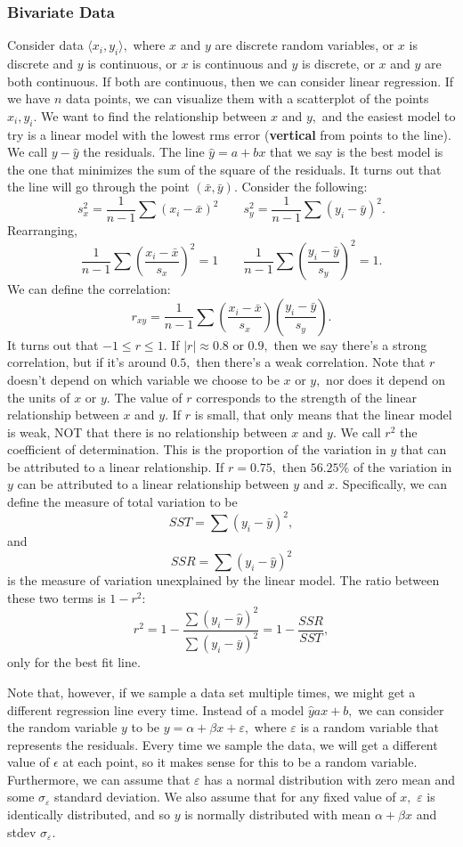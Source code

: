 \documentclass[12pt]{article}
\theoremstyle{remark}
\begin{document}
\subsubsection{Bivariate Data}
Consider data $\langle x_i,y_i\rangle,$ where $x$ and $y$ are discrete random variables, or $x$ is discrete and $y$ is continuous, or $x$ is continuous and $y$ is discrete, or $x$ and $y$ are both continuous. If both are continuous, then we can consider linear regression.
If we have $n$ data points, we can visualize them with a scatterplot of the points $x_i,y_i.$ We want to find the relationship between $x$ and $y,$ and the easiest model to try is a linear model with the lowest rms error (\textbf{vertical} from points to the line). We call $y-\hat{y}$ the residuals. The line $\hat y=a+bx$ that we say is the best model is the one that minimizes the sum of the square of the residuals. It turns out that the line will go through the point $(\bar{x},\bar{y}).$ Consider the following:
\[s_x^2=\frac{1}{n-1}\sum(x_i-\bar{x})^2\qquad s_y^2=\frac{1}{n-1}\sum (y_i-\bar{y})^2.\] Rearranging,
\[\frac{1}{n-1}\sum\left(\frac{x_i-\bar{x}}{s_x}\right)^2=1\qquad \frac{1}{n-1}\sum \left(\frac{y_i-\bar{y}}{s_y}\right)^2=1.\]
We can define the correlation:
\[r_{xy}=\frac{1}{n-1}\sum\left(\frac{x_i-\bar{x}}{s_x}\right)\left(\frac{y_i-\bar{y}}{s_y}\right).\] It turns out that $-1\le r\le 1.$ If $|r|\approx 0.8$ or $0.9,$ then we say there's a strong correlation, but if it's around $0.5,$ then there's a weak correlation. Note that $r$ doesn't depend on which variable we choose to be $x$ or $y,$ nor does it depend on the units of $x$ or $y.$ The value of $r$ corresponds to the strength of the linear relationship between $x$ and $y.$ If $r$ is small, that only means that the linear model is weak, NOT that there is no relationship between $x$ and $y.$ We call $r^2$ the coefficient of determination. This is the proportion of the variation in $y$ that can be attributed to a linear relationship. If $r=0.75,$ then $56.25\%$ of the variation in $y$ can be attributed to a linear relationship between $y$ and $x.$ Specifically, we can define the measure of total variation to be
\[SST=\sum (y_i-\bar{y})^2,\] and
\[SSR=\sum(y_i-\hat y)^2\] is the measure of variation unexplained by the linear model. The ratio between these two terms is $1-r^2:$
\[r^2=1-\frac{\sum(y_i-\hat y)^2}{\sum(y_i-\bar{y})^2}=1-\frac{SSR}{SST},\] only for the best fit line.

Note that, however, if we sample a data set multiple times, we might get a different regression line every time. Instead of a model $\hat y ax+b,$ we can consider the random variable $y$ to be $y=\alpha +\beta x+\varepsilon,$ where $\varepsilon$ is a random variable that represents the residuals. Every time we sample the data, we will get a different value of $\epsilon$ at each point, so it makes sense for this to be a random variable. Furthermore, we can assume that $\varepsilon$ has a normal distribution with zero mean and some $\sigma_\varepsilon$ standard deviation. We also assume that for any fixed value of $x,$ $\varepsilon$ is identically distributed, and so $y$ is normally distributed with mean $\alpha +\beta x$ and stdev $\sigma_\varepsilon.$
\end{document}
